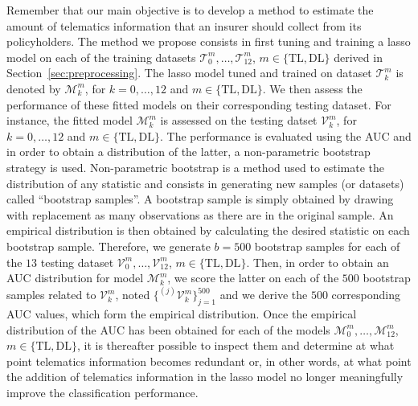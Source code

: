 \documentclass{article}
\begin{document}
Remember that our main objective is to develop a method to estimate the amount of telematics information that an insurer should collect from its policyholders. The method we propose consists in first tuning and training a lasso model on each of the training datasets $\mathcal{T}_0^m, \dots, \mathcal{T}_{12}^m$, $m \in \{\text{TL}, \text{DL}\}$ derived in Section~\ref{sec:preprocessing}. The lasso model tuned and trained on dataset $\mathcal{T}_k^m$ is denoted by $\mathcal{M}_k^m$, for $k = 0, \dots, 12$ and $m \in \{\text{TL}, \text{DL}\}$. We then assess the performance of these fitted models on their corresponding testing dataset. For instance, the fitted model $\mathcal{M}_k^m$ is assessed on the testing datset $\mathcal{V}_k^m$, for $k = 0, \dots, 12$ and $m \in \{\text{TL}, \text{DL}\}$. The performance is evaluated using the AUC and in order to obtain a distribution of the latter, a non-parametric bootstrap strategy is used. Non-parametric bootstrap is a method used to estimate the distribution of any statistic and consists in generating new samples (or datasets) called ``bootstrap samples''. A bootstrap sample is simply obtained by drawing with replacement as many observations as there are in the original sample. An empirical distribution is then obtained by calculating the desired statistic on each bootstrap sample. Therefore, we generate $b = 500$ bootstrap samples for each of the $13$ testing dataset $\mathcal{V}_0^m, \dots, \mathcal{V}_{12}^m$, $m \in \{\text{TL}, \text{DL}\}$. Then, in order to obtain an AUC distribution for model $\mathcal{M}_k^m$, we score the latter on each of the $500$ bootstrap samples related to $\mathcal{V}_k^m$, noted $\{^{(j)}\mathcal{V}_k^m\}_{j = 1}^{500}$ and we derive the $500$ corresponding AUC values, which form the empirical distribution. Once the empirical distribution of the AUC has been obtained for each of the models $\mathcal{M}_0^m, \dots, \mathcal{M}_{12}^m$, $m \in \{\text{TL}, \text{DL}\}$, it is thereafter possible to inspect them and determine at what point telematics information becomes redundant or, in other words, at what point the addition of telematics information in the lasso model no longer meaningfully improve the classification performance.
\end{document}
